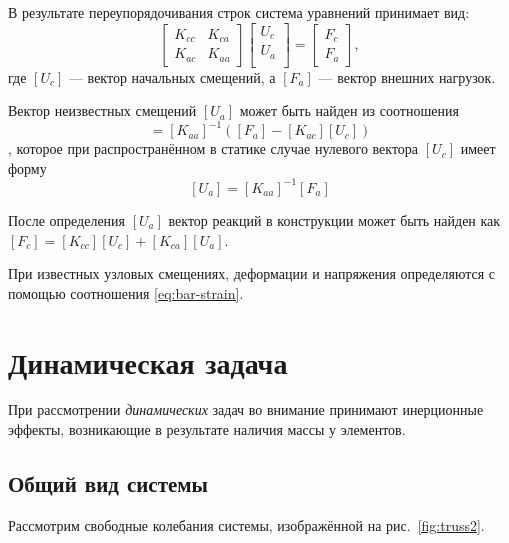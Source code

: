 \documentclass[10pt]{article}
\numberwithin{equation}{section}
\newcommand{\matr}[1]{[#1]}
\newcommand{\figref}[1]{рис. \ref{#1}}
\begin{document}
В результате переупорядочивания строк система уравнений принимает вид:
\begin{equation*}
  \label{eq:system-partitioned}
  \begin{bmatrix}
    K_{cc}& K_{ca} \\
    K_{ac}& K_{aa}
  \end{bmatrix}
  \begin{bmatrix}
    U_c\\
    U_a\\
  \end{bmatrix}
  =
  \begin{bmatrix}
    F_c\\
    F_a
  \end{bmatrix},
\end{equation*}
где $\matr{U_c}$ — вектор начальных смещений, а $\matr{F_a}$ — вектор
внешних нагрузок.

Вектор неизвестных смещений $\matr{U_a}$ может быть найден из соотношения
\begin{equation}
  \matr{U_a} = \matr{K_{aa}}^{-1}(\matr{F_a} - \matr{K_{ac}}\matr{U_c})
\end{equation},
которое при распространённом в статике случае нулевого вектора
$\matr{U_c}$ имеет форму
\begin{equation}
  \label{eq:displacements}
  \matr{U_a} = \matr{K_{aa}}^{-1}\matr{F_a}
\end{equation}

После определения $\matr{U_a}$ вектор реакций в конструкции может быть
найден как $\matr{F_c} = \matr{K_{cc}}\matr{U_c} +
\matr{K_{ca}}\matr{U_a}$.

При известных узловых смещениях, деформации и напряжения определяются
с помощью соотношения \eqref{eq:bar-strain}.

\clearpage
\section{Динамическая задача}

При рассмотрении \emph{динамических} задач во внимание принимают
инерционные эффекты, возникающие в результате наличия массы у
элементов.

\subsection{Общий вид системы}

Рассмотрим свободные колебания системы, изображённой на
\figref{fig:truss2}.
\end{document}
